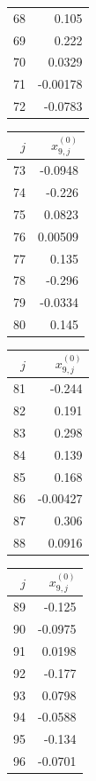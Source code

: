 {\begin{tabular}[t]{r|r}
68 & 0.105 \\
69 & 0.222 \\
70 & 0.0329 \\
71 & -0.00178 \\
72 & -0.0783
\end{tabular}\kern4pt
\begin{tabular}[t]{r|r}
$j$ & $x^{(0)}_{9,j}$ \\\hline
73 & -0.0948 \\
74 & -0.226 \\
75 & 0.0823 \\
76 & 0.00509 \\
77 & 0.135 \\
78 & -0.296 \\
79 & -0.0334 \\
80 & 0.145
\end{tabular}\kern4pt
\begin{tabular}[t]{r|r}
$j$ & $x^{(0)}_{9,j}$ \\\hline
81 & -0.244 \\
82 & 0.191 \\
83 & 0.298 \\
84 & 0.139 \\
85 & 0.168 \\
86 & -0.00427 \\
87 & 0.306 \\
88 & 0.0916
\end{tabular}\kern4pt
\begin{tabular}[t]{r|r}
$j$ & $x^{(0)}_{9,j}$ \\\hline
89 & -0.125 \\
90 & -0.0975 \\
91 & 0.0198 \\
92 & -0.177 \\
93 & 0.0798 \\
94 & -0.0588 \\
95 & -0.134 \\
96 & -0.0701
\end{tabular}}

